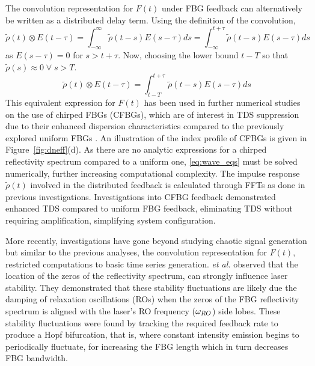 %
\par
%
The convolution representation for $F(t)$ under FBG feedback can alternatively be written as a distributed delay term. Using the definition of the convolution,
%
\begin{equation*}
    \tilde{\rho}(t) \otimes E(t-\tau)
    = \int_{-\infty}^{\infty} \tilde{\rho}(t-s) E(s-\tau) ds 
    = \int_{-\infty}^{t+\tau} \tilde{\rho}(t-s) E(s-\tau) ds
\end{equation*}
%
as $E(s-\tau)=0$ for $s>t+\tau$. Now, choosing the lower bound $t-T$ so that $\tilde{\rho}(s) \approx 0 \; \forall \; s>T$.
%
\begin{equation*}
    \tilde{\rho}(t) \otimes E(t-\tau) = \int_{t-T}^{t+\tau} \tilde{\rho}(t-s) E(s - \tau) ds
\end{equation*}
%
This equivalent expression for $F(t)$ has been used in further numerical studies on the use of chirped FBGs (CFBGs), 
which are of interest in TDS suppression due to their enhanced dispersion characteristics compared to the previously explored uniform FBGs \cite{wang2017time, wang2019key, wang2023critical, chao2020permutation}. 
An illustration of the index profile of CFBGs is given in Figure~\ref{fig:dneff}(d). 
As there are no analytic expressions for a chirped reflectivity spectrum compared to a uniform one, \eqref{eq:wave_eqs} must be solved numerically, further increasing computational complexity. 
The impulse response $\tilde{\rho}(t)$ involved in the distributed feedback is calculated through FFTs as done in previous investigations. 
Investigations into CFBG feedback demonstrated enhanced TDS compared to uniform FBG feedback, eliminating TDS without requiring amplification, simplifying system configuration.
%
\par
%
More recently, investigations have gone beyond studying chaotic signal generation but similar to the previous analyses, the convolution representation for $F(t)$, restricted computations to basic time series generation. 
\Skenderas \textit{et al.} observed that the location of the zeros of the reflectivity spectrum, can strongly influence laser stability. 
They demonstrated that these stability fluctuations are likely due the damping of relaxation oscillations (ROs) when the zeros of the FBG reflectivity spectrum is aligned with the laser's RO frequency ($\omega_{RO}$) side lobes. 
These stability fluctuations were found by tracking the required feedback rate to produce a Hopf bifurcation, that is, where constant intensity emission begins to periodically fluctuate, for increasing the FBG length which in turn decreases FBG bandwidth. 
